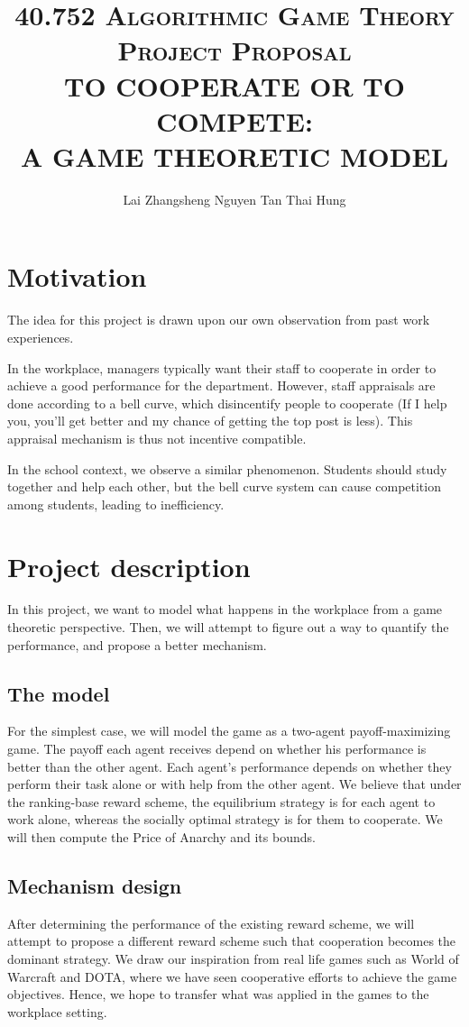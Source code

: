 \documentclass[11pt, a4paper]{article}
\title{
	\vspace*{-1.5cm}
	\scshape 40.752 Algorithmic Game Theory\\
	\vspace{0.5cm}
	Project Proposal\\
	\vspace{0.5cm}
	{\bfseries\Large TO COOPERATE OR TO COMPETE: \\
		A GAME THEORETIC MODEL}\\
	\vspace{0.5cm}}
\author{Lai Zhangsheng \qquad \qquad Nguyen Tan Thai Hung}
\date{}
\begin{document}
\maketitle


\section{Motivation}
The idea for this project is drawn upon our own observation from past work experiences. 

In the workplace, managers typically want their staff to cooperate in order to achieve a good performance for the department. However, staff appraisals are done according to a bell curve, which disincentify people to cooperate (If I help you, you'll get better and my chance of getting the top post is less). This appraisal mechanism is thus not incentive compatible. 

In the school context, we observe a similar phenomenon. Students should study together and help each other, but the bell curve system can cause competition among students, leading to inefficiency.

\section{Project description}
In this project, we want to model what happens in the workplace from a game theoretic perspective. Then, we will attempt to figure out a way to quantify the performance, and propose a better mechanism.

\subsection{The model}
For the simplest case, we will model the game as a two-agent payoff-maximizing game. The payoff each agent receives depend on whether his performance is better than the other agent. Each agent's performance depends on whether they perform their task alone or with help from the other agent. We believe that under the ranking-base reward scheme, the equilibrium strategy is for each agent to work alone, whereas the socially optimal strategy is for them to cooperate. We will then compute the Price of Anarchy and its bounds.

\subsection{Mechanism design}
After determining the performance of the existing reward scheme, we will attempt to propose a different reward scheme such that cooperation becomes the dominant strategy. We draw our inspiration from real life games such as World of Warcraft and DOTA, where we have seen cooperative efforts to achieve the game objectives. Hence, we hope to transfer what was applied in the games to the workplace setting.
\end{document}
